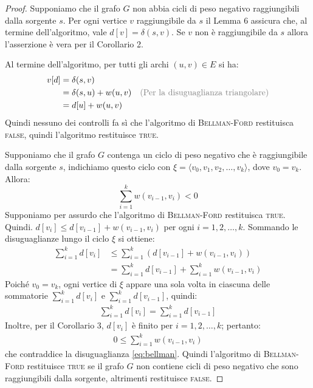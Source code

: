 \begin{proof}
	Supponiamo che il grafo $G$ non abbia cicli di peso negativo raggiungibili dalla sorgente $s$. Per ogni vertice $v$ raggiungibile da $s$ il Lemma 6 assicura che, al termine dell'algoritmo, vale $d[v]=\delta(s,v)$. Se $v$ non è raggiungibile da $s$ allora l'asserzione è vera per il Corollario 2.

Al termine dell'algoritmo, per tutti gli archi $(u,v) \in E$ si ha:
\begin{align*}
	v[d] &= \delta(s,v)\\
		&= \delta(s,u) + w(u,v) & \text{\textcolor{gray}{(Per la disuguaglianza triangolare)}}\\
		&= d[u] + w(u,v)
\end{align*}
Quindi nessuno dei controlli fa sì che l'algoritmo di \textsc{Bellman-Ford} restituisca \textsc{false}, quindi l'algoritmo restituisce \textsc{true}.

Supponiamo che il grafo $G$ contenga un ciclo di peso negativo che è raggiungibile dalla sorgente $s$, indichiamo questo ciclo con $\xi = \langle v_{0},v_{1},v_{2},\ldots,v_{k} \rangle$, dove $v_{0}=v_{k}$. Allora:
\begin{equation}\label{eq:bellman}
	\sum_{i=1}^{k}w(v_{i-1},v_{i})<0
\end{equation}
Supponiamo per assurdo che l'algoritmo di \textsc{Bellman-Ford} restituisca \textsc{true}. Quindi. $d[v_{i}]\leq d[v_{i-1}]+w(v_{i-1},v_{i})$ per ogni $i=1,2,\ldots,k$. Sommando le disuguaglianze lungo il ciclo $\xi$ si ottiene:
\begin{align*}
	\sum_{i=1}^{k} d[v_{i}] &\leq \sum_{i=1}^{k} (d[v_{i-1}] + w(v_{i-1},v_{i})) \\
	&= \sum_{i=1}^{k} d[v_{i-1}] + \sum_{i=1}^{k} w(v_{i-1},v_{i})
\end{align*}
Poiché $v_{0}=v_{k}$, ogni vertice di $\xi$ appare una sola volta in ciascuna delle sommatorie $\sum_{i=1}^{k} d[v_{i}]$ e $\sum_{i=1}^{k}d[v_{i-1}]$, quindi:
\begin{align*}
	\sum_{i=1}^{k} d[v_{i}] = \sum_{i=1}^{k} d[v_{i-1}]
\end{align*}
Inoltre, per il Corollario 3, $d[v_{i}]$ è finito per $i=1,2,\ldots, k$; pertanto:
\begin{align*}
	0 \leq \sum_{i=1}^{k} w(v_{i-1},v_{i})
\end{align*}
che contraddice la disuguaglianza \ref{eq:bellman}. Quindi l'algoritmo di \textsc{Bellman-Ford} restituisce \textsc{true} se il grafo $G$ non contiene cicli di peso negativo che sono raggiungibili dalla sorgente, altrimenti restituisce \textsc{false}. 
\end{proof}


